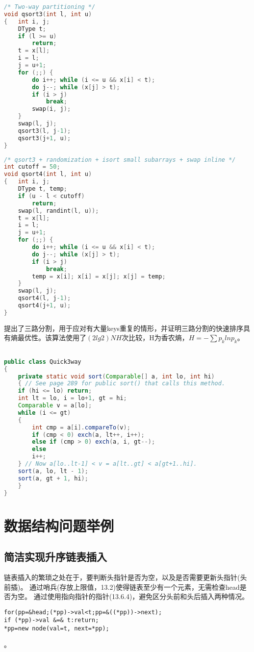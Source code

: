 \begin{lstlisting}[language=C]
/* Two-way partitioning */
void qsort3(int l, int u)
{	int i, j;
	DType t;
	if (l >= u)
		return;
	t = x[l];
	i = l;
	j = u+1;
	for (;;) {
		do i++; while (i <= u && x[i] < t);
		do j--; while (x[j] > t);
		if (i > j)
			break;
		swap(i, j);
	}
	swap(l, j);
	qsort3(l, j-1);
	qsort3(j+1, u);
}
\end{lstlisting}


\begin{lstlisting}[language=C]
/* qsort3 + randomization + isort small subarrays + swap inline */
int cutoff = 50;
void qsort4(int l, int u)
{	int i, j;
	DType t, temp;
	if (u - l < cutoff)
		return;
	swap(l, randint(l, u));
	t = x[l];
	i = l;
	j = u+1;
	for (;;) {
		do i++; while (i <= u && x[i] < t);
		do j--; while (x[j] > t);
		if (i > j)
			break;
		temp = x[i]; x[i] = x[j]; x[j] = temp;
	}
	swap(l, j);
	qsort4(l, j-1);
	qsort4(j+1, u);
}

\end{lstlisting}

\cite{sedgewick}提出了三路分割，用于应对有大量keys重复的情形，并证明三路分割的快速排序具有熵最优性。该算法使用了$(2lg2)NH$次比较，H为香农熵，$H=-\sum{p_{k}lnp_k}$。


\begin{lstlisting}[language=Java]

public class Quick3way
{
    private static void sort(Comparable[] a, int lo, int hi)
    { // See page 289 for public sort() that calls this method.
	if (hi <= lo) return;
	int lt = lo, i = lo+1, gt = hi;
	Comparable v = a[lo];
	while (i <= gt)
	{
	    int cmp = a[i].compareTo(v);
	    if (cmp < 0) exch(a, lt++, i++);
	    else if (cmp > 0) exch(a, i, gt--);
	    else
	    i++;
	} // Now a[lo..lt-1] < v = a[lt..gt] < a[gt+1..hi].
	sort(a, lo, lt - 1);
	sort(a, gt + 1, hi);
    }
}
\end{lstlisting}





\section{数据结构问题举例}
\subsection{简洁实现升序链表插入}
链表插入的繁琐之处在于，要判断头指针是否为空，以及是否需要更新头指针(头前插)。
通过哨兵(存放上限值，\cite{pp}13.2)使得链表至少有一个元素，无需检查head是否为空。
通过使用指向指针的指针(\cite{pp}13.6.4)，避免区分头前和头后插入两种情况。
\begin{verbatim}
for(pp=&head;(*pp)->val<t;pp=&((*pp))->next);
if (*pp)->val &=& t:return; 
*pp=new node(val=t, next=*pp);
\end{verbatim}
\label{problem:listInsert}。


